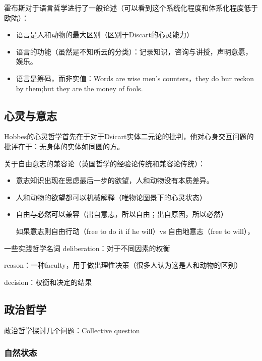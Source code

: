 霍布斯对于语言哲学进行了一般论述（可以看到这个系统化程度和体系化程度低于欧陆）：

\begin{itemize}
    \item 语言是人和动物的最大区别（区别于Discart的心灵能力）
    \item 语言的功能（虽然是不知所云的分类）：记录知识，咨询与讲授，声明意愿，娱乐。
    \item 语言是筹码，而非实值：Words are wise men’s counters，they do bur reckon by them;but they are the money of fools. 
\end{itemize}

\subsection{心灵与意志}

Hobbes的心灵哲学首先在于对于Dsicart实体二元论的批判，他对心身交互问题的批评在于：无身体的实体如同圆的方。

关于自由意志的兼容论（英国哲学的经验论传统和兼容论传统）：

\begin{itemize}
    \item 意志知识出现在思虑最后一步的欲望，人和动物没有本质差异。
    \item 人和动物的欲望都可以机械解释（唯物论图景下的心灵状态）
    \item 自由与必然可以兼容（出自意志，所以自由；出自原因，所以必然）
    
    如果意志则自由行动（free to do it if he will）vs 自由地意志（free to will），
\end{itemize}

\begin{fancybox}{一些实践哲学名词}
    deliberation：对于不同因素的权衡
    
    reason：一种faculty，用于做出理性决策（很多人认为这是人和动物的区别）

    decision：权衡和决定的结果
\end{fancybox}

\subsection{政治哲学}

政治哲学探讨几个问题：Collective question 

\subsubsection{自然状态}


